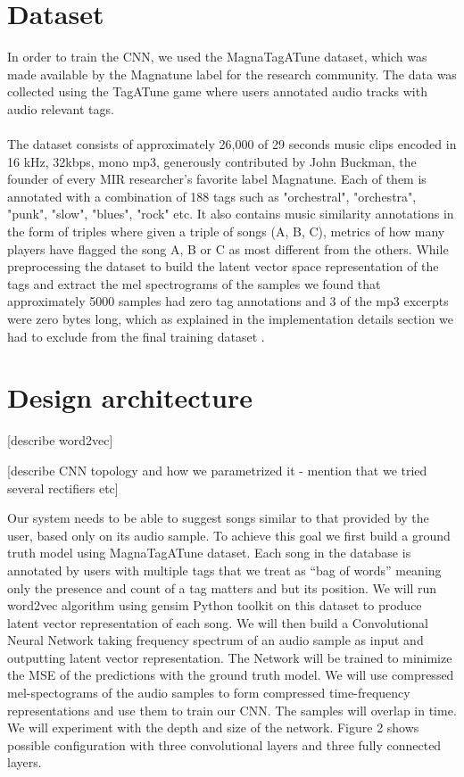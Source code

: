 \documentclass[11pt, a4paper]{article}
\begin{document}
  \section{Dataset}
    In order to train the CNN, we used the MagnaTagATune dataset, which was
    made available by the Magnatune label for the research community. The
    data was collected using the TagATune game where users annotated audio
    tracks with audio relevant tags.
    \\ \\
    \noindent
    The dataset consists of approximately 26,000 of 29 seconds music clips
    encoded in 16 kHz, 32kbps, mono mp3, generously contributed by John
    Buckman, the founder of every MIR researcher's favorite label Magnatune.
    Each of them is annotated with a combination of 188 tags such as
    "orchestral", "orchestra", "punk", "slow", "blues", "rock" etc. It also
    contains music similarity annotations in the form of triples where given a
    triple of songs (A, B, C), metrics of how many players have flagged the
    song A, B or C as most different from the others. While preprocessing the
    dataset to build the latent vector space representation of the tags and 
    extract the mel spectrograms of the samples we found that approximately
    5000 samples had zero tag annotations and 3 of the mp3 excerpts were zero
    bytes long, which as explained in the implementation details section we
    had to exclude from the final training dataset \cite{magnatagatune}.

  \section{Design architecture}
    [describe word2vec]

    [describe CNN topology and how we parametrized it - mention that we tried
    several rectifiers etc]

    Our system needs to be able to suggest songs similar to that provided by
    the user, based only on its audio sample. To achieve this goal we first
    build a ground truth model using MagnaTagATune dataset. Each song in the
    database is annotated by users with multiple tags that we treat as ``bag of
    words'' meaning only the presence and count of a tag matters and but its
    position. We will run word2vec algorithm using gensim Python toolkit on
    this dataset to produce latent vector representation of each song. We will
    then build a Convolutional Neural Network taking frequency spectrum of an
    audio sample as input and outputting latent vector representation. The
    Network will be trained to minimize the MSE of the predictions with the
    ground truth model. We will use compressed mel-spectograms of the audio
    samples to form compressed time-frequency representations and use them to
    train our CNN. The samples will overlap in time. We will experiment with
    the depth and size of the network. Figure 2 shows possible configuration
    with three convolutional layers and three fully connected layers.
\end{document}
